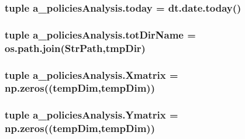 \hypertarget{namespacea__policies_analysis_ac936b84a5183306b66c17f9ba26eb355}{
\subsubsection[{today}]{\setlength{\rightskip}{0pt plus 5cm}tuple a\-\_\-policies\-Analysis.\-today = dt.\-date.\-today()}}\label{namespacea__policies_analysis_ac936b84a5183306b66c17f9ba26eb355}
\hypertarget{namespacea__policies_analysis_a7eeedc08a26db83bdede1674114e614c}{
\subsubsection[{tot\-Dir\-Name}]{\setlength{\rightskip}{0pt plus 5cm}tuple a\-\_\-policies\-Analysis.\-tot\-Dir\-Name = os.\-path.\-join({\bf Str\-Path},tmp\-Dir)}}\label{namespacea__policies_analysis_a7eeedc08a26db83bdede1674114e614c}
\hypertarget{namespacea__policies_analysis_a2367ad8a6cb7095c8fb6f9faf3362c56}{
\subsubsection[{Xmatrix}]{\setlength{\rightskip}{0pt plus 5cm}tuple a\-\_\-policies\-Analysis.\-Xmatrix = np.\-zeros(({\bf temp\-Dim},{\bf temp\-Dim}))}}\label{namespacea__policies_analysis_a2367ad8a6cb7095c8fb6f9faf3362c56}
\hypertarget{namespacea__policies_analysis_a0f31378af00ebb084697eb1903d572fa}{
\subsubsection[{Ymatrix}]{\setlength{\rightskip}{0pt plus 5cm}tuple a\-\_\-policies\-Analysis.\-Ymatrix = np.\-zeros(({\bf temp\-Dim},{\bf temp\-Dim}))}}\label{namespacea__policies_analysis_a0f31378af00ebb084697eb1903d572fa}
